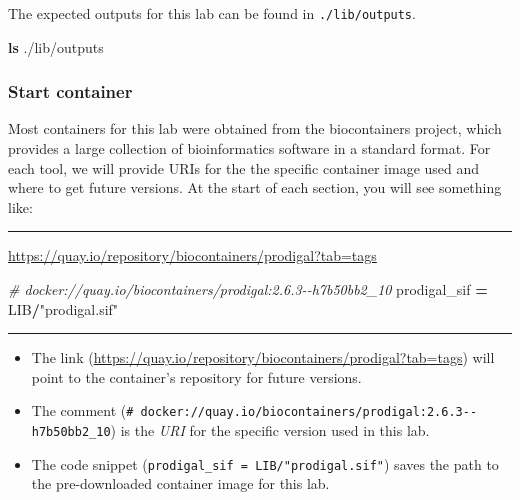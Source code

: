 \documentclass[
]{book}
\newenvironment{Shaded}{\begin{snugshade}}{\end{snugshade}}
\newcommand{\CommentTok}[1]{\textcolor[rgb]{0.56,0.35,0.01}{\textit{#1}}}
\newcommand{\FunctionTok}[1]{\textcolor[rgb]{0.13,0.29,0.53}{\textbf{#1}}}
\newcommand{\NormalTok}[1]{#1}
\newcommand{\OperatorTok}[1]{\textcolor[rgb]{0.81,0.36,0.00}{\textbf{#1}}}
\newcommand{\StringTok}[1]{\textcolor[rgb]{0.31,0.60,0.02}{#1}}
\providecommand{\tightlist}{%
  \setlength{\itemsep}{0pt}\setlength{\parskip}{0pt}}
\begin{document}
The expected outputs for this lab can be found in \texttt{./lib/outputs}.

\begin{Shaded}
\begin{Highlighting}[]
\FunctionTok{ls}\NormalTok{ ./lib/outputs}
\end{Highlighting}
\end{Shaded}

\subsubsection{Start container}\label{start-container}

Most containers for this lab were obtained from the biocontainers project, which provides a large collection of bioinformatics software in a standard format.
For each tool, we will provide URIs for the the specific container image used and where to get future versions. At the start of each section,
you will see something like:

\begin{center}\rule{0.5\linewidth}{0.5pt}\end{center}

\url{https://quay.io/repository/biocontainers/prodigal?tab=tags}

\begin{Shaded}
\begin{Highlighting}[numbers=left,,]
\CommentTok{\# docker://quay.io/biocontainers/prodigal:2.6.3{-}{-}h7b50bb2\_10}
\NormalTok{prodigal\_sif }\OperatorTok{=}\NormalTok{ LIB}\OperatorTok{/}\StringTok{"prodigal.sif"}
\end{Highlighting}
\end{Shaded}

\begin{center}\rule{0.5\linewidth}{0.5pt}\end{center}

\begin{itemize}
\tightlist
\item
  The link (\url{https://quay.io/repository/biocontainers/prodigal?tab=tags}) will point to the container's repository for future versions.
\item
  The comment (\texttt{\#\ docker://quay.io/biocontainers/prodigal:2.6.3-\/-h7b50bb2\_10}) is the \emph{URI} for the specific version used in this lab.
\item
  The code snippet (\texttt{prodigal\_sif\ =\ LIB/"prodigal.sif"}) saves the path to the pre-downloaded container image for this lab.
\end{itemize}
\end{document}
